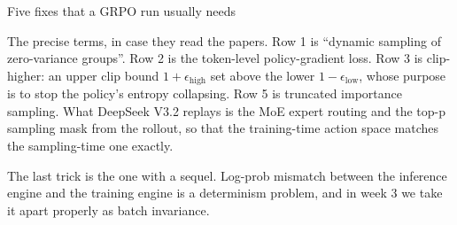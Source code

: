 \documentclass[aspectratio=169,10pt]{beamer}
\begin{document}
\begin{frame}[t,shrink=9]{Five fixes that a GRPO run usually needs}
{  The precise terms, in case they read the papers. Row 1 is ``dynamic sampling
  of zero-variance groups''. Row 2 is the token-level policy-gradient loss.
  Row 3 is clip-higher: an upper clip bound $1+\epsilon_{\mathrm{high}}$ set
  above the lower $1-\epsilon_{\mathrm{low}}$, whose purpose is to stop the
  policy's entropy collapsing. Row 5 is truncated importance sampling. What
  DeepSeek V3.2 replays is the MoE expert routing and the top-p sampling mask
  from the rollout, so that the training-time action space matches the
  sampling-time one exactly.

  The last trick is the one with a sequel. Log-prob mismatch between the
  inference engine and the training engine is a determinism problem, and in
  week 3 we take it apart properly as batch invariance.}
\end{frame}
\fi
\end{document}
